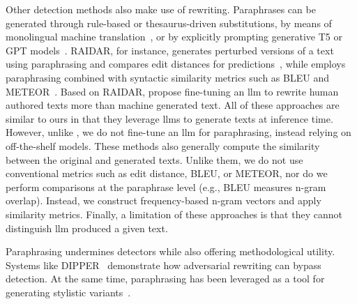 Other detection methods also make use of rewriting. 
Paraphrases can be generated through rule-based or thesaurus-driven substitutions, by means of monolingual machine translation~\citep{zhou_paraphrase_2021}, or by explicitly prompting generative T5 or GPT models~\citep{kurt_pehlivanoglu_comparative_2024}.
RAIDAR, for instance, generates perturbed versions of a text using paraphrasing and compares edit distances for predictions~\citep{mao_raidar_2024}, while \mirrorMinds{} employs paraphrasing combined with syntactic similarity metrics such as BLEU and METEOR~\citep{baradia_mirror_2025}. 
Based on RAIDAR, \citet{li_learning_2025} propose fine-tuning an \ac{llm} to rewrite human authored texts more than machine generated text.
All of these approaches are similar to ours in that they leverage \acp{llm} to generate texts at inference time. 
However, unlike \citet{li_learning_2025}, we do not fine-tune an \ac{llm} for paraphrasing, instead relying on off-the-shelf models.
These methods also generally compute the similarity between the original and generated texts. 
Unlike them, we do not use conventional metrics such as edit distance, BLEU, or METEOR, nor do we perform comparisons at the paraphrase level (e.g., BLEU measures n-gram overlap). 
Instead, we construct frequency-based n-gram vectors and apply similarity metrics.
Finally, a limitation of these approaches is that they cannot distinguish \ac{llm} produced a given text.

Paraphrasing undermines detectors while also offering methodological utility. 
Systems like DIPPER~\citep{Krishna_dipper_2023} demonstrate how adversarial rewriting can bypass detection. 
At the same time, paraphrasing has been leveraged as a tool for generating stylistic variants~\citep{mao_raidar_2024,baradia_mirror_2025}.
